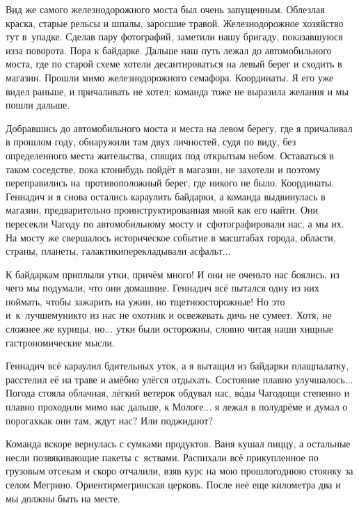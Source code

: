 Вид же самого железнодорожного моста был очень запущенным. Облезлая краска, старые рельсы и шпалы, заросшие травой. Железнодорожное хозяйство тут в~упадке. Сделав пару фотографий, заметили нашу бригаду, показавшуюся из\sdash за поворота. Пора к байдарке. Дальше наш путь лежал до автомобильного моста, где по старой схеме хотели десантироваться на левый берег и сходить в магазин. Прошли мимо железнодорожного семафора. Координаты\mdash \CoordsChagodoschaSemaphor. Я его уже видел раньше, и причаливать не хотел; команда тоже не выразила желания и мы пошли дальше. 

Добравшись до автомобильного моста и места на левом берегу, где я причаливал в прошлом году, обнаружили там двух личностей, судя по виду, без определенного места жительства, спящих под открытым небом. Оставаться в таком соседстве, пока кто\sdash нибудь пойдёт в магазин, не захотели и поэтому переправились на~противоположный берег, где никого не было. Координаты\mdash \CoordsChagodoschaSixteenGoToStore. Геннадич и я снова остались караулить байдарки, а команда выдвинулась в магазин, предварительно проинструктированная мной как его найти. Они пересекли Чагоду по автомобильному мосту и~сфотографировали нас, а мы их. На мосту же свершалось историческое событие в масштабах города, области, страны, планеты, галактики\mdash  перекладывали асфальт$\ldots$ 

К байдаркам приплыли утки, причём много! И они не очень\sdash то нас боялись, из чего мы подумали, что они домашние. Геннадич всё пытался одну из них поймать, чтобы зажарить на ужин, но тщетно\mdash осторожные! Но это и~к~лучшему\mdash никто из нас не охотник и освежевать дичь не сумеет. Хотя, не сложнее же курицы, но$\ldots$ утки были осторожны, словно читая наши хищные гастрономические мысли.

Геннадич всё караулил бдительных уток, а я вытащил из байдарки плащ\sdash палатку, расстелил её на траве и амёбно улёгся отдыхать. Состояние плавно улучшалось$\ldots$ Погода стояла облачная, лёгкий ветерок обдувал нас, в\'{о}ды Чагодощи степенно и плавно проходили мимо нас дальше, к Мологе$\ldots$ я лежал в полудрёме и думал о порогах\mdash как они там, ждут нас? Или поджидают?

Команда вскоре вернулась с сумками продуктов. Ваня кушал пиццу, а остальные несли позвякивающие пакеты с~яствами. Распихали всё прикупленное по грузовым отсекам и скоро отчалили, взяв курс на мою прошлогоднюю стоянку за селом Мегрино. Ориентир\mdash мегринская церковь. После неё еще километра два и мы должны быть на месте.

